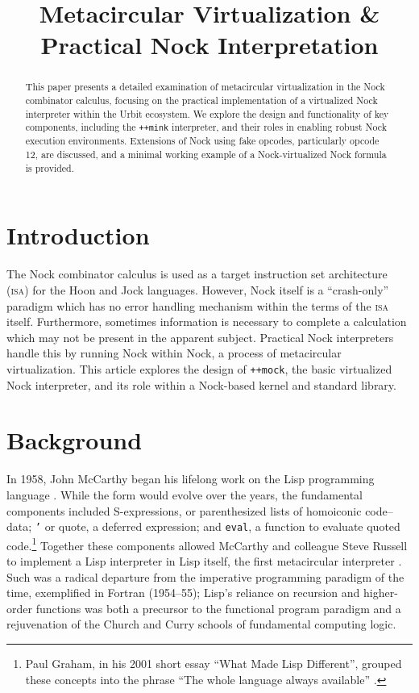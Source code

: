 \documentclass[twoside]{article}
\title{Metacircular Virtualization \& \\ Practical Nock Interpretation}
\author{\authorpatp}
\date{}
\begin{document}
\maketitle
\thispagestyle{firststyle}

\begin{abstract}
  \sloppy
  This paper presents a detailed examination of meta\-circular virtualization in the Nock combinator calculus, focusing on the practical implementation of a virtualized Nock interpreter within the Urbit ecosystem. We explore the design and functionality of key components, including the \lstinline[style=inlinecode]{++mink} interpreter, and their roles in enabling robust Nock execution environments.  Extensions of Nock using fake opcodes, particularly opcode 12, are discussed, and a minimal working example of a Nock-virtualized Nock formula is provided.
\end{abstract}

\setcounter{page}{71}

\tableofcontents

\section{Introduction}

The Nock combinator calculus is used as a target instruction set architecture (\textsc{isa}) for the Hoon and Jock languages.  However, Nock itself is a ``crash-only'' paradigm which has no error handling mechanism within the terms of the \textsc{isa} itself.  Furthermore, sometimes information is necessary to complete a calculation which may not be present in the apparent subject.  Practical Nock interpreters handle this by running Nock within Nock, a process of metacircular virtualization.  This article explores the design of \lstinline[style=inlinecode]{++mock}, the basic virtualized Nock interpreter, and its role within a Nock-based kernel and standard library.

\section{Background}

In 1958, John McCarthy began his lifelong work on the Lisp programming language \citep{McCarthy1996}.  While the form would evolve over the years, the fundamental components included S-expressions, or parenthesized lists of homoiconic code–data; \texttt{'} or quote, a deferred expression; and \texttt{eval}, a function to evaluate quoted code.\footnote{Paul Graham, in his 2001 short essay ``What Made Lisp Different'', grouped these concepts into the phrase ``The whole language always available'' \citep{Graham2001}.}  Together these components allowed McCarthy and colleague Steve Russell to implement a Lisp interpreter in Lisp itself, the first metacircular interpreter \citep{McCarthy1978}.  Such was a radical departure from the imperative programming paradigm of the time, exemplified in Fortran (1954–55); Lisp's reliance on recursion and higher-order functions was both a precursor to the functional program paradigm and a rejuvenation of the Church and Curry schools of fundamental computing logic.
\end{document}
